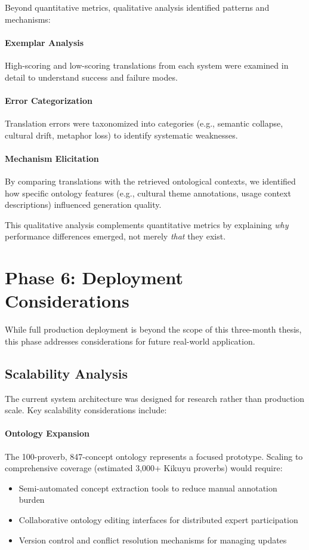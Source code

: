 Beyond quantitative metrics, qualitative analysis identified patterns and mechanisms:

\paragraph{Exemplar Analysis} High-scoring and low-scoring translations from each system were examined in detail to understand success and failure modes.

\paragraph{Error Categorization} Translation errors were taxonomized into categories (e.g., semantic collapse, cultural drift, metaphor loss) to identify systematic weaknesses.

\paragraph{Mechanism Elicitation} By comparing translations with the retrieved ontological contexts, we identified how specific ontology features (e.g., cultural theme annotations, usage context descriptions) influenced generation quality.

This qualitative analysis complements quantitative metrics by explaining \emph{why} performance differences emerged, not merely \emph{that} they exist.

\section{Phase 6: Deployment Considerations}
\label{sec:phase_deployment}

While full production deployment is beyond the scope of this three-month thesis, this phase addresses considerations for future real-world application.

\subsection{Scalability Analysis}
\label{subsec:scalability}

The current system architecture was designed for research rather than production scale. Key scalability considerations include:

\paragraph{Ontology Expansion} The 100-proverb, 847-concept ontology represents a focused prototype. Scaling to comprehensive coverage (estimated 3,000+ Kikuyu proverbs) would require:
\begin{itemize}
    \item Semi-automated concept extraction tools to reduce manual annotation burden
    \item Collaborative ontology editing interfaces for distributed expert participation
    \item Version control and conflict resolution mechanisms for managing updates
\end{itemize}

